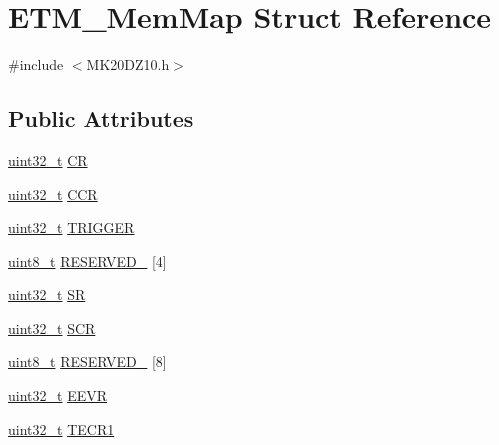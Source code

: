 \hypertarget{struct_e_t_m___mem_map}{}\section{E\+T\+M\+\_\+\+Mem\+Map Struct Reference}
\label{struct_e_t_m___mem_map}


{\ttfamily \#include $<$M\+K20\+D\+Z10.\+h$>$}

\subsection*{Public Attributes}
\begin{DoxyCompactItemize}
\item 
\hyperlink{_p_e___types_8h_a33594304e786b158f3fb30289278f5af}{uint32\+\_\+t} \hyperlink{struct_e_t_m___mem_map_a1073427a5d49856222f104cfccad7dc9}{CR}
\item 
\hyperlink{_p_e___types_8h_a33594304e786b158f3fb30289278f5af}{uint32\+\_\+t} \hyperlink{struct_e_t_m___mem_map_ae429b2d6bbe8b448eefc4e9a19ef6435}{C\+CR}
\item 
\hyperlink{_p_e___types_8h_a33594304e786b158f3fb30289278f5af}{uint32\+\_\+t} \hyperlink{struct_e_t_m___mem_map_a0acebf95863ac9ae5ccbc9a87e48be62}{T\+R\+I\+G\+G\+ER}
\item 
\hyperlink{_p_e___types_8h_aba7bc1797add20fe3efdf37ced1182c5}{uint8\+\_\+t} \hyperlink{struct_e_t_m___mem_map_a46cac7e75b35d2789d910585d5b20df3}{R\+E\+S\+E\+R\+V\+E\+D\+\_} \mbox{[}4\mbox{]}
\item 
\hyperlink{_p_e___types_8h_a33594304e786b158f3fb30289278f5af}{uint32\+\_\+t} \hyperlink{struct_e_t_m___mem_map_af91fa67ecfbfa6eb2d20588bbf32215b}{SR}
\item 
\hyperlink{_p_e___types_8h_a33594304e786b158f3fb30289278f5af}{uint32\+\_\+t} \hyperlink{struct_e_t_m___mem_map_a21304c0be7e04790f0c022f40d2ef1aa}{S\+CR}
\item 
\hyperlink{_p_e___types_8h_aba7bc1797add20fe3efdf37ced1182c5}{uint8\+\_\+t} \hyperlink{struct_e_t_m___mem_map_ab49b0b2a953a291cce1b7432cfeeeb67}{R\+E\+S\+E\+R\+V\+E\+D\+\_} \mbox{[}8\mbox{]}
\item 
\hyperlink{_p_e___types_8h_a33594304e786b158f3fb30289278f5af}{uint32\+\_\+t} \hyperlink{struct_e_t_m___mem_map_a8f38f88c8652ae9e793d53c519dd657e}{E\+E\+VR}
\item 
\hyperlink{_p_e___types_8h_a33594304e786b158f3fb30289278f5af}{uint32\+\_\+t} \hyperlink{struct_e_t_m___mem_map_a190e1e7ffbcf9b1b6c6d543aa4e1fbc4}{T\+E\+C\+R1}

\end{DoxyCompactItemize}
